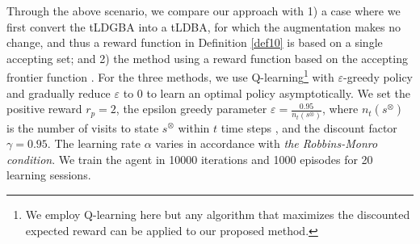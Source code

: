 Through the above scenario,
we compare our approach with 1) a case where we first convert the tLDGBA into a tLDBA, for which the augmentation makes no change, and thus a reward function in Definition \ref{def10} is based on a single accepting set; and
2) the method using a reward function based on the accepting frontier function \cite{HAK2019,HKAKPL2019}.
For the three methods, we use Q-learning\footnote{We employ Q-learning here but any algorithm that maximizes the discounted expected reward can be applied to our proposed method.} with $\varepsilon$-greedy policy and gradually reduce $\varepsilon$ to 0 to learn an optimal policy asymptotically.
We set the positive reward $r_p = 2$, the epsilon greedy parameter $ \varepsilon = \frac{0.95}{n_t(s^{\otimes})}$, where $n_t(s^{\otimes})$ is the number of visits to state $s^{\otimes}$ within $t$ time steps \cite{Singh1998}, and the discount factor $\gamma = 0.95$. The learning rate $\alpha$ varies in accordance with {\it the Robbins-Monro condition}. We train the agent in 10000 iterations and 1000 episodes for 20 learning sessions.

